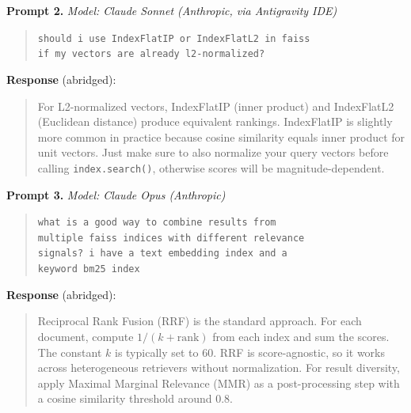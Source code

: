 \documentclass[a4paper,12pt]{article}
\begin{document}
\noindent\textbf{Prompt 2.} \textit{Model: Claude Sonnet (Anthropic, via Antigravity IDE)}

\begin{quote}
\small
\texttt{should i use IndexFlatIP or IndexFlatL2 in faiss}\\
\texttt{if my vectors are already l2-normalized?}
\end{quote}

\noindent\textbf{Response} (abridged):
\begin{quote}
\small
For L2-normalized vectors, IndexFlatIP (inner product) and IndexFlatL2 (Euclidean distance) produce equivalent rankings. IndexFlatIP is slightly more common in practice because cosine similarity equals inner product for unit vectors. Just make sure to also normalize your query vectors before calling \texttt{index.search()}, otherwise scores will be magnitude-dependent.
\end{quote}

\bigskip

\noindent\textbf{Prompt 3.} \textit{Model: Claude Opus (Anthropic)}

\begin{quote}
\small
\texttt{what is a good way to combine results from}\\
\texttt{multiple faiss indices with different relevance}\\
\texttt{signals? i have a text embedding index and a}\\
\texttt{keyword bm25 index}
\end{quote}

\noindent\textbf{Response} (abridged):
\begin{quote}
\small
Reciprocal Rank Fusion (RRF) is the standard approach. For each document, compute $1/(k + \text{rank})$ from each index and sum the scores. The constant $k$ is typically set to 60. RRF is score-agnostic, so it works across heterogeneous retrievers without normalization. For result diversity, apply Maximal Marginal Relevance (MMR) as a post-processing step with a cosine similarity threshold around 0.8.
\end{quote}

\newpage
\printbibliography[heading=bibintoc, title={References}]
\end{document}
